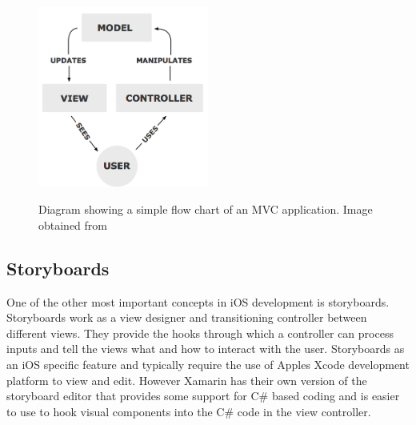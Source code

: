 \documentclass[main.tex]{subfiles}
\begin{document}
\begin{figure}[H]
\centering
\includegraphics[width=0.5\textwidth]{images-implementation/MVCLayout.png}
\label{MVC}
\caption{Diagram showing a simple flow chart of an MVC application. Image obtained from \cite{mvc}}
\end{figure}


\subsection{Storyboards}
One of the other most important concepts in iOS development is storyboards. Storyboards work as a view designer and transitioning controller between different views. They provide the hooks through which a controller can process inputs and tell the views what and how to interact with the user. Storyboards as an iOS specific feature and typically require the use of Apples Xcode development platform to view and edit. However Xamarin has their own version of the storyboard editor that provides some support for C# based coding and is easier to use to hook visual components into the C# code in the view controller.
\end{document}
